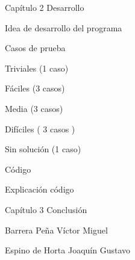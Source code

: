 \documentclass[
  ignorenonframetext,
]{beamer}
\begin{document}
\begin{frame}{Capítulo 2 Desarrollo}
\protect\hypertarget{capuxedtulo-2-desarrollo}{}
\begin{block}{Idea de desarrollo del programa}
\protect\hypertarget{idea-de-desarrollo-del-programa}{}
\end{block}

\begin{block}{Casos de prueba}
\protect\hypertarget{casos-de-prueba}{}
\begin{block}{Triviales (1 caso)}
\protect\hypertarget{triviales-1-caso}{}
\end{block}

\begin{block}{Fáciles (3 casos)}
\protect\hypertarget{fuxe1ciles-3-casos}{}
\end{block}

\begin{block}{Media (3 casos)}
\protect\hypertarget{media-3-casos}{}
\end{block}

\begin{block}{Difíciles ( 3 casos )}
\protect\hypertarget{difuxedciles-3-casos}{}
\end{block}

\begin{block}{Sin solución (1 caso)}
\protect\hypertarget{sin-soluciuxf3n-1-caso}{}
\end{block}

\begin{block}{Código}
\protect\hypertarget{cuxf3digo}{}
\end{block}
\end{block}

\begin{block}{Explicación código}
\protect\hypertarget{explicaciuxf3n-cuxf3digo}{}
\end{block}
\end{frame}

\begin{frame}{Capítulo 3 Conclusión}
\protect\hypertarget{capuxedtulo-3-conclusiuxf3n}{}
\begin{block}{Barrera Peña Víctor Miguel}
\protect\hypertarget{barrera-peuxf1a-vuxedctor-miguel}{}
\end{block}

\begin{block}{Espino de Horta Joaquín Gustavo}
\protect\hypertarget{espino-de-horta-joaquuxedn-gustavo}{}
\end{block}
\end{frame}
\end{document}
